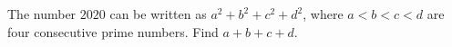 The number $2020$ can be written as $a^2+b^2+c^2+d^2$, where $a<b<c<d$ are four consecutive prime numbers. Find $a+b+c+d$.
